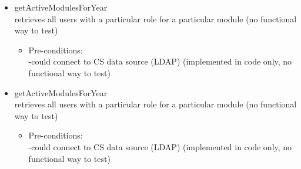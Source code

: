 \begin {itemize}
\begin {itemize}
\item {getActiveModulesForYear}\\
retrieves all users with a particular role for a particular module (no functional way to test)
\begin {itemize}
\item Pre-conditions:\\
-could connect to CS data source (LDAP) (implemented in code only, no functional way to test)\\  
\end {itemize}
\end {itemize}

\begin {itemize}
\item {getActiveModulesForYear}\\
retrieves all users with a particular role for a particular module (no functional way to test)
\begin {itemize}
\item Pre-conditions:\\
-could connect to CS data source (LDAP) (implemented in code only, no functional way to test)\\  
\end {itemize}
\end {itemize}






\end {itemize}
